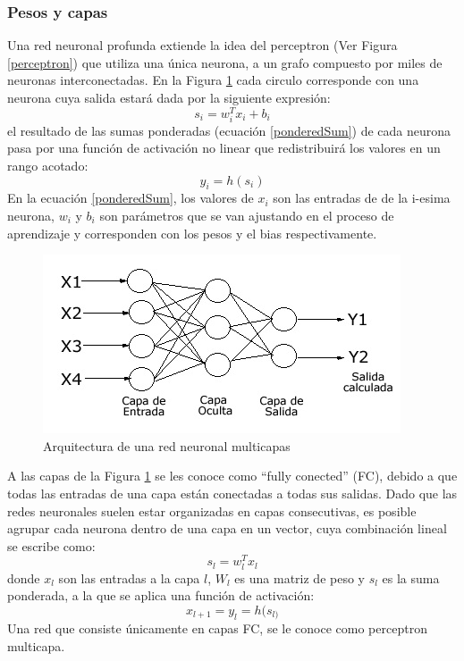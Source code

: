 \subsubsection{Pesos y capas}
Una red neuronal profunda extiende la idea del perceptron (Ver Figura \ref{perceptron}) que utiliza una única neurona, a un grafo compuesto por miles de neuronas interconectadas. En la Figura \ref{NeuralNetworkArq} cada circulo corresponde con una neurona cuya salida estará dada por la siguiente expresión:
\begin{equation}
    s_{i} = w_{i}^{T} x_{i} + b_{i} \label{ponderedSum}
\end{equation}
el resultado de las sumas ponderadas (ecuación \ref{ponderedSum}) de cada neurona pasa por una función de activación no linear que redistribuirá los valores en un rango acotado:
\begin{equation}
    y_{i} = h(s_{i})
\end{equation}
En la ecuación \ref{ponderedSum}, los valores de $x_{i}$ son las entradas de de la i-esima neurona, $w_{i}$ y $b_{i}$ son parámetros que se van ajustando en el proceso de aprendizaje y corresponden con los pesos y el bias respectivamente. 
\begin{figure}[H]
    \centering
    \includegraphics{Recursos/NeuralNetwork.jpg}
    \caption{Arquitectura de una red neuronal multicapas}
    \label{NeuralNetworkArq}
\end{figure}
A las capas de la Figura \ref{NeuralNetworkArq} se les conoce como ``fully conected'' (FC), debido a que todas las entradas de una capa están conectadas a todas sus salidas. Dado que las redes neuronales suelen estar organizadas en capas consecutivas, es posible agrupar cada neurona dentro de una capa en un vector, cuya combinación lineal se escribe como:
\begin{equation}
    s_{l} = w_{l}^{T} x_{l}
\end{equation}
donde $x_{l}$ son las entradas a la capa $l$, $W_{l}$ es una matriz de peso y $s_{l}$ es la suma ponderada, a la que se aplica una función de activación:
\begin{equation}
    x_{l+1} = y_{l} = h(s_{l)}
\end{equation}
Una red que consiste únicamente en capas FC, se le conoce como perceptron multicapa. 
